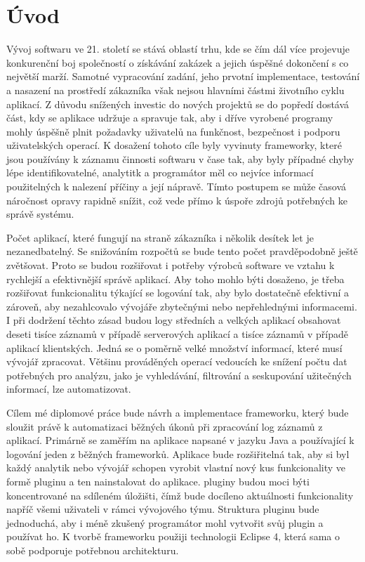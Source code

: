 \documentclass[ing,male,java,dept460]{diploma}		%
\begin{document}
\section{Úvod}
\label{sec:Uvod}
\par Vývoj softwaru ve 21. století se stává oblastí trhu, kde se čím dál více projevuje konkurenční boj společností o získávání zakázek a jejich úspěšné dokončení s co největší marží. Samotné vypracování zadání, jeho prvotní implementace, testování a nasazení na prostředí zákazníka však nejsou hlavními částmi životního cyklu aplikací. Z důvodu snížených investic do nových projektů se do popředí dostává část, kdy se aplikace udržuje a spravuje tak, aby i dříve vyrobené programy mohly úspěšně plnit požadavky uživatelů na funkčnost, bezpečnost i podporu uživatelských operací. K dosažení tohoto cíle byly vyvinuty frameworky, které jsou používány  k záznamu činnosti softwaru v čase tak, aby byly případné chyby lépe identifikovatelné, analytitk a programátor měl co nejvíce informací použitelných k nalezení příčiny a její nápravě. Tímto postupem se může časová náročnost opravy rapidně snížit, což vede přímo k úspoře zdrojů potřebných ke správě systému.
\par Počet aplikací, které fungují na straně zákazníka i několik desítek let je nezanedbatelný. Se snižováním rozpočtů se bude tento počet pravděpodobně ještě zvětšovat. Proto se budou rozšiřovat i potřeby výrobců software ve vztahu k rychlejší a efektivnější správě aplikací. Aby toho mohlo býti dosaženo, je třeba rozšiřovat funkcionalitu týkající se logování tak, aby bylo dostatečně efektivní a zároveň, aby nezahlcovalo vývojáře zbytečnými nebo nepřehlednými informacemi. I při dodržení těchto zásad budou logy středních a velkých aplikací obsahovat deseti tisíce záznamů v případě serverových aplikací a tisíce záznamů v případě aplikací klientských. Jedná se o poměrně velké množství informací, které musí vývojář zpracovat. Většinu prováděných operací vedoucích ke snížení počtu dat potřebných pro analýzu, jako je vyhledávání, filtrování a seskupování užitečných informací, lze automatizovat.
\par Cílem mé diplomové práce bude návrh a implementace frameworku, který bude sloužit právě k automatizaci běžných úkonů při zpracování log záznamů z aplikací. Primárně se zaměřím na aplikace napsané v jazyku Java a používající k logování jeden z běžných frameworků. Aplikace bude rozšiřitelná tak, aby si byl každý analytik nebo vývojář schopen vyrobit vlastní nový kus funkcionality ve formě pluginu a ten nainstalovat do aplikace. pluginy budou moci býti koncentrované na sdíleném úložišti, čímž bude docíleno aktuálnosti funkcionality napříč všemi uživateli v rámci vývojového týmu. Struktura pluginu bude jednoduchá, aby i méně zkušený programátor mohl vytvořit svůj plugin a používat ho. K tvorbě frameworku použiji technologii Eclipse 4, která sama o sobě podporuje potřebnou architekturu.
\end{document}
